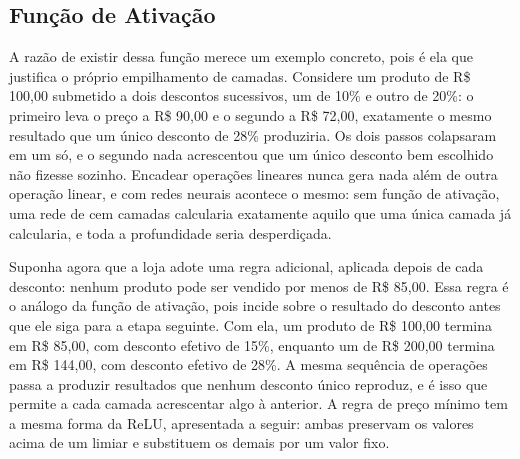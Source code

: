 
\subsection{Função de Ativação}

A razão de existir dessa função merece um exemplo concreto, pois é ela que justifica o
próprio empilhamento de camadas. Considere um produto de R\$ 100,00 submetido a dois
descontos sucessivos, um de 10\% e outro de 20\%: o primeiro leva o preço a R\$ 90,00 e o
segundo a R\$ 72,00, exatamente o mesmo resultado que um único desconto de 28\% produziria.
Os dois passos colapsaram em um só, e o segundo nada acrescentou que um único desconto bem
escolhido não fizesse sozinho. Encadear operações lineares nunca gera nada além de outra
operação linear, e com redes neurais acontece o mesmo: sem função de ativação, uma rede de
cem camadas calcularia exatamente aquilo que uma única camada já calcularia, e toda a
profundidade seria desperdiçada.

Suponha agora que a loja adote uma regra adicional, aplicada depois de cada desconto: nenhum
produto pode ser vendido por menos de R\$ 85,00. Essa regra é o análogo da função de ativação,
pois incide sobre o resultado do desconto antes que ele siga para a etapa seguinte. Com ela, um
produto de R\$ 100,00 termina em R\$ 85,00, com desconto efetivo de 15\%, enquanto um de
R\$ 200,00 termina em R\$ 144,00, com desconto efetivo de 28\%. A mesma sequência de operações
passa a produzir resultados que nenhum desconto único reproduz, e é isso que permite a cada
camada acrescentar algo à anterior. A regra de preço mínimo tem a mesma forma da ReLU,
apresentada a seguir: ambas preservam os valores acima de um limiar e substituem os demais por
um valor fixo.

